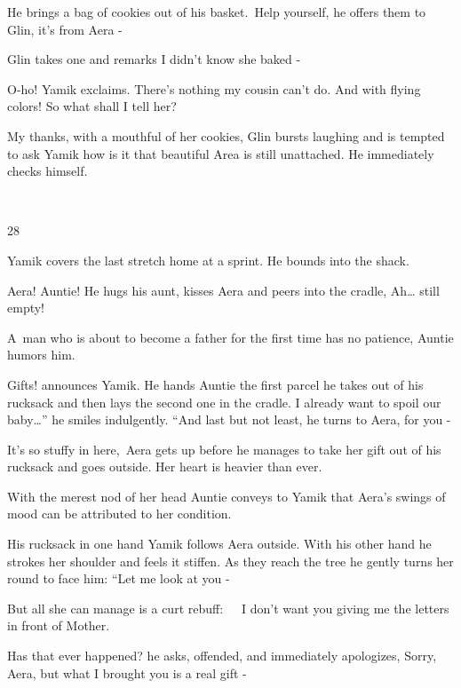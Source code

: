 \documentclass[twoside,11pt]{book}
\begin{document}
He brings a bag of cookies out of his basket.\ {\textquotedbl}Help yourself,{\textquotedbl} he offers them to Glin,
{\textquotedbl}it's from Aera -{\textquotedbl} 

Glin takes one and remarks {\textquotedbl}I didn't know she baked -{\textquotedbl}

{\textquotedbl}O-ho!{\textquotedbl} Yamik exclaims. {\textquotedbl}There's nothing my cousin can't do. And with flying
colors! So what shall I tell her?{\textquotedbl} 

{\textquotedbl}My thanks, with a mouthful of her cookies,{\textquotedbl} Glin bursts laughing and is tempted to ask
Yamik how is it that beautiful Area is still unattached. He immediately checks himself.

~

28~~~~~~~~~~~~~ 

Yamik covers the last stretch home at a sprint. He bounds into the shack. 

{\textquotedbl}Aera! Auntie!{\textquotedbl} He hugs his aunt, kisses Aera and peers into the cradle,
{\textquotedbl}Ah{\dots} still empty!{\textquotedbl} 

{\textquotedbl}A~man who is about to become a father for the first time has no patience,{\textquotedbl} Auntie humors
him. 

{\textquotedbl}Gifts!{\textquotedbl} announces Yamik. He hands Auntie the first parcel he takes out of his rucksack and
then lays the second one in the cradle. {\textquotedbl}I already want to spoil our baby{\dots}'' he smiles indulgently.
``And last but not least,{\textquotedbl} he turns to Aera, {\textquotedbl}for you -{\textquotedbl}

{\textquotedbl}It's so stuffy in here,{\textquotedbl}~Aera gets up before he manages to take her gift out of his
rucksack and goes outside. Her heart is heavier than ever.

With the merest nod of her head Auntie conveys to Yamik that Aera's swings of mood can be attributed to her condition.

His rucksack in one hand Yamik follows Aera outside. With his other hand he strokes her shoulder and feels it stiffen.
As they reach the tree he gently turns her round to face him: ``Let me look at you -{\textquotedbl}

But all she can manage is a curt rebuff:\ \ \ {\textquotedbl}I don't want you giving me the letters in front of
Mother.{\textquotedbl} 

{\textquotedbl}Has that ever happened?{\textquotedbl} he asks, offended, and immediately apologizes,
{\textquotedbl}Sorry, Aera, but what I brought you is a real gift -{\textquotedbl} 
\end{document}
